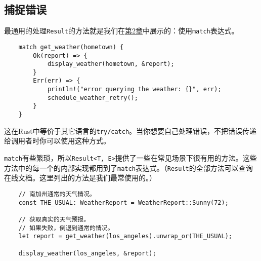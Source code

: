\subsection{捕捉错误}
最通用的处理\texttt{Result}的方法就是我们在\hyperref[ch02]{第2章}中展示的：使用\texttt{match}表达式。
\begin{verbatim}
    match get_weather(hometown) {
        Ok(report) => {
            display_weather(hometown, &report);
        }
        Err(err) => {
            println!("error querying the weather: {}", err);
            schedule_weather_retry();
        }
    }
\end{verbatim}

这在Rust中等价于其它语言的\texttt{try/catch}。当你想要自己处理错误，不把错误传递给调用者时你可以使用这种方式。

\texttt{match}有些繁琐，所以\texttt{Result<T, E>}提供了一些在常见场景下很有用的方法。这些方法中的每一个的内部实现都用到了\texttt{match}表达式。（\texttt{Result}的全部方法可以查询在线文档。这里列出的方法是我们最常使用的。）





\begin{verbatim}
    // 南加州通常的天气情况。
    const THE_USUAL: WeatherReport = WeatherReport::Sunny(72);

    // 获取真实的天气预报。
    // 如果失败，倒退到通常的情况。
    let report = get_weather(los_angeles).unwrap_or(THE_USUAL);

    display_weather(los_angeles, &report);
\end{verbatim}



